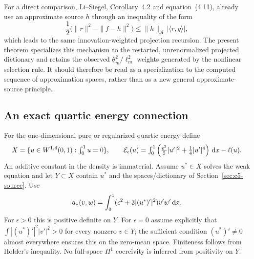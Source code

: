 \documentclass[11pt]{article}
\theoremstyle{remark}
\begin{document}
For a direct comparison, Li--Siegel, Corollary~4.2 and equation~(4.11),
already use an approximate source \(h\) through an inequality of the form
\[
 \frac12\big(\|r\|^2-\|f-h\|^2\big)
 \leq \|h\|_{\mathcal A}\,|\langle r,g\rangle|,
\]
which leads to the same innovation-weighted projection recursion. The
present theorem specializes this mechanism to the restarted, unrenormalized
projected dictionary and retains the observed
\(\underline\theta_m^2/\ell_m^2\) weights generated by the nonlinear selection rule. It
should therefore be read as a specialization to the computed sequence of approximation
spaces, rather than as a new general approximate-source principle.

\subsection{An exact quartic energy connection}
\label{sec:c5-quartic}

For the one-dimensional pure or regularized quartic energy define
\[
 X=\{u\in W^{1,4}(0,1):\textstyle\int_0^1u=0\},\qquad
 \mathcal E_\epsilon(u)=\int_0^1
       \left(\tfrac{\epsilon^2}2|u'|^2+\tfrac14|u'|^4\right)\,\mathrm d x-\ell(u).
\]
An additive constant in the density is immaterial.
Assume $u^*\in X$ solves the weak equation and let $Y\subset X$
contain $u^*$ and the spaces/dictionary of
Section~\ref{sec:c5-source}. Use
\[
 a_*(v,w)=\int_0^1(\epsilon^2+3|(u^*)'|^2)v'w'\,\mathrm d x .
\]
For $\epsilon>0$ this is positive definite on $Y$.
For $\epsilon=0$ assume explicitly that
$\int |(u^*)'|^2|v'|^2>0$ for every nonzero $v\in Y$;
the sufficient condition $(u^*)'\ne0$ almost everywhere ensures this
on the zero-mean space. Finiteness follows from Holder's inequality.
No full-space $H^1$ coercivity is inferred from positivity on $Y$.
\end{document}
